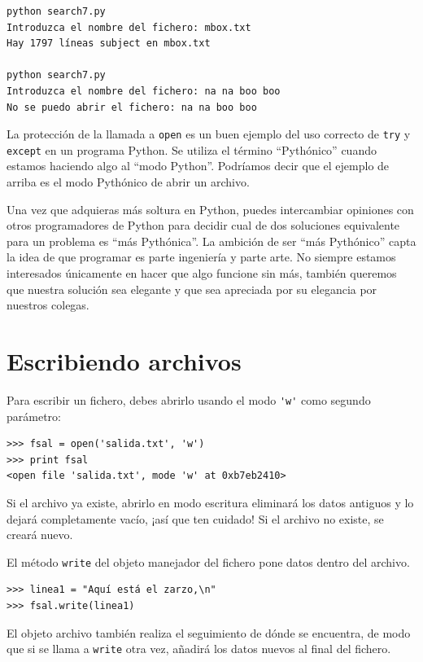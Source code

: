 \beforeverb
\begin{verbatim}
python search7.py
Introduzca el nombre del fichero: mbox.txt
Hay 1797 líneas subject en mbox.txt

python search7.py
Introduzca el nombre del fichero: na na boo boo
No se puedo abrir el fichero: na na boo boo
\end{verbatim}
\afterverb
%
La protección de la llamada a {\tt open} es un buen ejemplo
del uso correcto de {\tt try}
y {\tt except} en un programa Python. Se utiliza el término
``Pythónico'' cuando estamos haciendo algo al ``modo
Python''. Podríamos decir que el ejemplo de arriba es
el modo Pythónico de abrir un archivo.

Una vez que adquieras más soltura en Python, puedes intercambiar
opiniones con otros programadores de Python para decidir
cual de dos soluciones equivalente para un problema es
``más Pythónica''. La ambición de ser ``más Pythónico''
capta la idea de que programar es parte ingeniería
y parte arte. No siempre estamos interesados únicamente
en hacer que algo funcione sin más, también queremos que nuestra solución
sea elegante y que sea apreciada por su elegancia
por nuestros colegas.


\section{Escribiendo archivos}


Para escribir un fichero, debes abrirlo usando el modo
\verb"'w'" como segundo parámetro:

\beforeverb
\begin{verbatim}
>>> fsal = open('salida.txt', 'w')
>>> print fsal
<open file 'salida.txt', mode 'w' at 0xb7eb2410>
\end{verbatim}
\afterverb
%
Si el archivo ya existe, abrirlo en modo escritura eliminará
los datos antiguos y lo dejará completamente vacío, ¡así que ten cuidado!
Si el archivo no existe, se creará nuevo.

El método {\tt write} del objeto manejador del fichero
pone datos dentro del archivo.

\beforeverb
\begin{verbatim}
>>> linea1 = "Aquí está el zarzo,\n"
>>> fsal.write(linea1)
\end{verbatim}
\afterverb
%
El objeto archivo también realiza el seguimiento de dónde se encuentra, de modo
que si se llama a {\tt write} otra vez, añadirá los datos nuevos al final del fichero.

